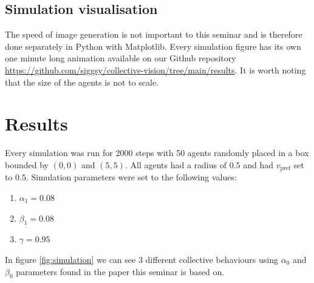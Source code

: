 \documentclass[9pt]{pnas-new}
\begin{document}
\subsection{Simulation visualisation}

The speed of image generation is not important to this seminar and is therefore done separately in Python with Matplotlib.
Every simulation figure has its own one minute long animation available on our Github repository \url{https://github.com/siggsy/collective-vision/tree/main/results}.
It is worth noting that the size of the agents is not to scale.


\section*{Results}

Every simulation was run for 2000 steps with 50 agents randomly placed in a box bounded by $(0,0)$ and $(5,5)$.
All agents had a radius of $0.5$ and had $v_\text{pref}$ set to $0.5$.
Simulation parameters were set to the following values:
\begin{enumerate}[label=$\bullet$]
    \item $\alpha_1 = 0.08$
    \item $\beta_1 = 0.08$
    \item $\gamma = 0.95$
\end{enumerate}

In figure \ref{fig:simulation} we can see 3 different collective behaviours using $\alpha_0$ and $\beta_0$ parameters found in the paper this seminar is based on\cite{main-paper}.
\end{document}
